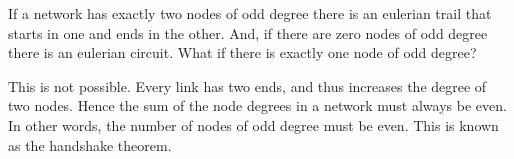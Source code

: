 
If a network has exactly two nodes of odd degree there is an eulerian trail that starts in one and ends in the other. And, if there are zero nodes of odd degree there is an eulerian circuit. What if there is exactly one node of odd degree?

\solution
This is not possible. Every link has two ends, and thus increases the degree of two nodes. Hence the sum of the node degrees in a network must always be even. In other words, the number of nodes of odd degree must be even. This is known as the handshake theorem.

